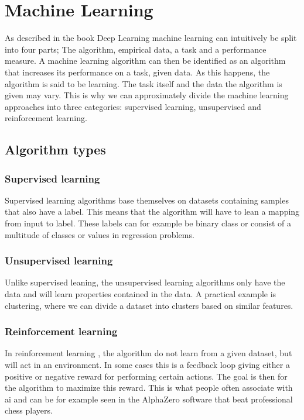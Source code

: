     
    
    
\clearpage
\section{Machine Learning} \label{Machine Learning}
    As described in the book Deep Learning\cite{Goodfellow-et-al-2016_ML} machine learning can intuitively be split into four parts; The algorithm, empirical data, a task and a performance measure. A machine learning algorithm can then be identified as an algorithm that increases its performance on a task, given data. As this happens, the algorithm is said to be learning. The task itself and the data the algorithm is given may vary. This is why we can approximately divide the machine learning approaches into three categories\cite{Goodfellow-et-al-2016_E}: supervised learning, unsupervised and reinforcement learning. 
    
    \subsection{Algorithm types} \label{Algorithm types}
        \subsubsection{Supervised learning}
            Supervised learning \cite{Goodfellow-et-al-2016_E} algorithms base themselves on datasets containing samples that also have a label. This means that the algorithm will have to lean a mapping from input to label. These labels can for example be binary class or consist of a multitude of classes or values in regression problems.
            
        \subsubsection{Unsupervised learning}
            Unlike supervised leaning, the unsupervised learning \cite{Goodfellow-et-al-2016_E} algorithms only have the data and will learn properties contained in the data. A practical example is clustering, where we can divide a dataset into clusters based on similar features. 
                
        \subsubsection{Reinforcement learning}
            In reinforcement learning \cite{Goodfellow-et-al-2016_E}, the algorithm do not learn from a given dataset, but will act in an environment. In some cases this is a feedback loop giving either a positive or negative reward for performing certain actions. The goal is then for the algorithm to maximize this reward. This is what people often associate with \gls{ai} and can be for example seen in the AlphaZero software that beat professional chess players\cite{silver2017mastering}.
    
